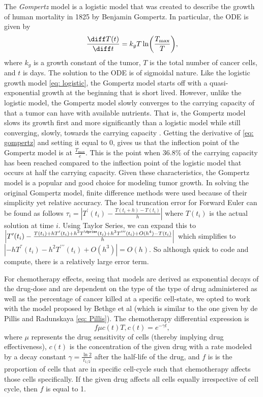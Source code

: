 \documentclass[11pt]{amsart}
\begin{document}
The \textit{Gompertz} model is a logistic model that was created to describe the growth of human mortality in 1825 by Benjamin Gompertz.
In particular, the ODE is given by
\begin{equation}
	\frac{\diff T(t)}{\diff t} = k_g T \ln \biggl(\frac{T_{\max}}{T} \biggr) \label{eq: gompertz},
\end{equation}
where $k_g$ is a growth constant of the tumor, $T$ is the total number of cancer cells, and $t$ is days.
The solution to the ODE is of sigmoidal nature.
Like the logistic growth model \eqref{eq: logistic}, the Gompertz model starts off with a quasi-exponential growth at the beginning that is short lived.
However, unlike the logistic model, the Gompertz model slowly converges to the carrying capacity of that a tumor can have with available nutrients.
That is, the Gompertz model slows its growth first and more significantly than a logistic model while still converging, slowly, towards the carrying capacity \cite{Steb23} .
Getting the derivative of \eqref{eq: gompertz} and setting it equal to 0, gives us that  the inflection point of the Gompertz model is at $\frac{T_{\max}}{e}$.
This is the point when 36.8\% of the carrying capacity has been reached compared to the inflection point of the logistic model that occurs at half the carrying capacity.
Given these characteristics, the Gompertz model is a popular and good choice for modeling tumor growth.
In solving the original Gompertz model, finite difference methods were used because of their simplicity yet relative accuracy. The local truncation error for Forward Euler can be found as follows $\tau_i = |T^\prime(t_i) - \frac{T(t_i + h) - T(t_i)}{h}|$  where $T(t_i)$ is the actual solution at time $i$. Using Taylor Series, we can expand this to $\Bigl |T^\prime(t_i) - \frac{T(t_i) + hT^\prime(t_i) + h^2T^\dprime(t_i) + h^3T^{\prime\prime\prime}(t_i) + O(h^4) - T(t_i)}{h}\Bigr |$ which simplifies to $|-hT^\dprime(t_i) - h^2T^{\prime \prime \prime}(t_i) + O(h^3)| = O(h)$. So although quick to code and compute, there is a relatively large error term. 


For chemotherapy effects, seeing that models are derived as exponential decays of the drug-dose and are dependent on the type of the type of drug administered as well as the percentage of cancer killed at a specific cell-state, we opted to work with the model proposed by Bethge et al (which is similar to the one given by de Pillis and Radunskaya \eqref{eq: Pillis}). The chemotherapy differential expression is 
\begin{equation}
	f \mu c(t) T, c(t) = e^{-\gamma t} \label{eq: chemo},
\end{equation}
where $\mu$ represents the drug sensitivity of cells (thereby implying drug effectiveness), $c(t)$ is the concentration of the given drug with a rate modeled by a decay constant $\gamma=\frac{\ln{2}}{t_{1/2}}$ after the half-life of the drug, and $f$ is is the proportion of cells that are in specific cell-cycle such that chemotherapy affects those cells specifically.
If the given drug affects all cells equally irrespective of cell cycle, then $f$ is equal to 1.
\end{document}
